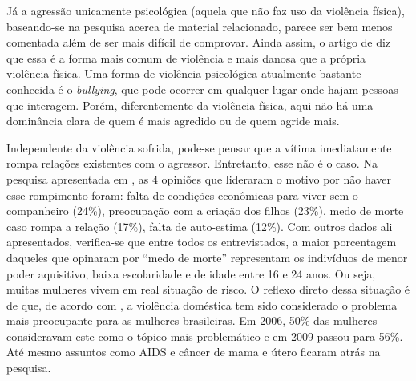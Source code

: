 \documentclass[12pt]{article}
\begin{document}
Já a agressão unicamente psicológica (aquela que não faz uso da
violência física), baseando-se na pesquisa acerca de material
relacionado, parece ser bem menos comentada além de ser mais difícil
de comprovar. Ainda assim, o artigo de \cite{penha1} diz que essa é a
forma mais comum de violência e mais danosa que a própria violência
física. Uma forma de violência psicológica atualmente bastante
conhecida é o \textit{bullying}, que pode ocorrer em qualquer lugar
onde hajam pessoas que interagem. Porém, diferentemente da violência
física, aqui não há uma dominância
clara de quem é mais agredido ou de quem agride mais.

Independente da violência sofrida,
pode-se pensar que a vítima imediatamente rompa
relações existentes com o agressor. Entretanto, esse não é o caso. Na
pesquisa apresentada em \cite{ibope1}, as 4 opiniões que lideraram o motivo
por não haver esse rompimento foram:
falta de condições econômicas para viver sem o companheiro (24\%),
preocupação com a criação dos filhos (23\%), medo de morte
caso rompa a relação (17\%), falta de auto-estima (12\%). Com outros
dados ali apresentados, verifica-se que entre todos os entrevistados, a maior
porcentagem daqueles que opinaram por ``medo de morte'' representam os
indivíduos de menor poder aquisitivo, baixa escolaridade e de idade entre
16 e 24 anos. Ou seja, muitas mulheres vivem em real situação de risco.
O reflexo direto dessa situação é de que, de acordo com \cite{avon1},
a violência doméstica tem sido considerado o problema mais preocupante
para as mulheres brasileiras. Em 2006, 50\% das mulheres consideravam este
como o tópico mais problemático e em 2009 passou para 56\%. Até mesmo
assuntos como AIDS e câncer de mama e útero ficaram atrás na pesquisa.
\end{document}
